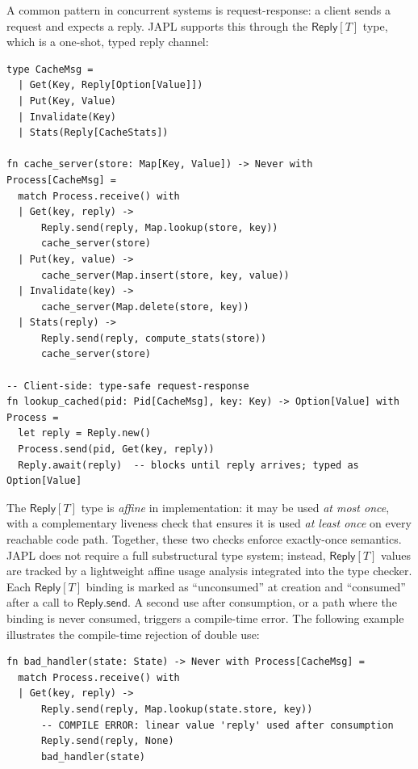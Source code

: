 \documentclass[11pt,a4paper]{article}
\begin{document}
A common pattern in concurrent systems is request-response: a client sends a request and expects a reply. JAPL supports this through the $\mathsf{Reply}[T]$ type, which is a one-shot, typed reply channel:

\begin{lstlisting}[language=japl,caption={Request-response with typed reply channels}]
type CacheMsg =
  | Get(Key, Reply[Option[Value]])
  | Put(Key, Value)
  | Invalidate(Key)
  | Stats(Reply[CacheStats])

fn cache_server(store: Map[Key, Value]) -> Never with Process[CacheMsg] =
  match Process.receive() with
  | Get(key, reply) ->
      Reply.send(reply, Map.lookup(store, key))
      cache_server(store)
  | Put(key, value) ->
      cache_server(Map.insert(store, key, value))
  | Invalidate(key) ->
      cache_server(Map.delete(store, key))
  | Stats(reply) ->
      Reply.send(reply, compute_stats(store))
      cache_server(store)

-- Client-side: type-safe request-response
fn lookup_cached(pid: Pid[CacheMsg], key: Key) -> Option[Value] with Process =
  let reply = Reply.new()
  Process.send(pid, Get(key, reply))
  Reply.await(reply)  -- blocks until reply arrives; typed as Option[Value]
\end{lstlisting}

The $\mathsf{Reply}[T]$ type is \emph{affine} in implementation: it may be used \emph{at most once}, with a complementary liveness check that ensures it is used \emph{at least once} on every reachable code path. Together, these two checks enforce exactly-once semantics. JAPL does not require a full substructural type system; instead, $\mathsf{Reply}[T]$ values are tracked by a lightweight affine usage analysis integrated into the type checker. Each $\mathsf{Reply}[T]$ binding is marked as ``unconsumed'' at creation and ``consumed'' after a call to $\mathsf{Reply.send}$. A second use after consumption, or a path where the binding is never consumed, triggers a compile-time error. The following example illustrates the compile-time rejection of double use:

\begin{lstlisting}[language=japl,caption={Compile error: Reply used twice}]
fn bad_handler(state: State) -> Never with Process[CacheMsg] =
  match Process.receive() with
  | Get(key, reply) ->
      Reply.send(reply, Map.lookup(state.store, key))
      -- COMPILE ERROR: linear value 'reply' used after consumption
      Reply.send(reply, None)
      bad_handler(state)
\end{lstlisting}
\end{document}
